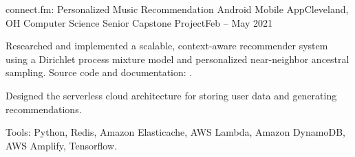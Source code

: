 \begin{ritemize}
{connect.fm: Personalized Music Recommendation Android Mobile App}{Cleveland, OH}
{Computer Science Senior Capstone Project}{Feb -- May 2021}
	\item Researched and implemented a scalable, context-aware recommender system using a Dirichlet process mixture model and personalized near-neighbor ancestral sampling. Source code and documentation: .
	\item Designed the serverless cloud architecture for storing user data and generating recommendations.
	\item Tools: Python, Redis, Amazon Elasticache, AWS Lambda, Amazon DynamoDB, AWS Amplify, Tensorflow.
\end{ritemize}